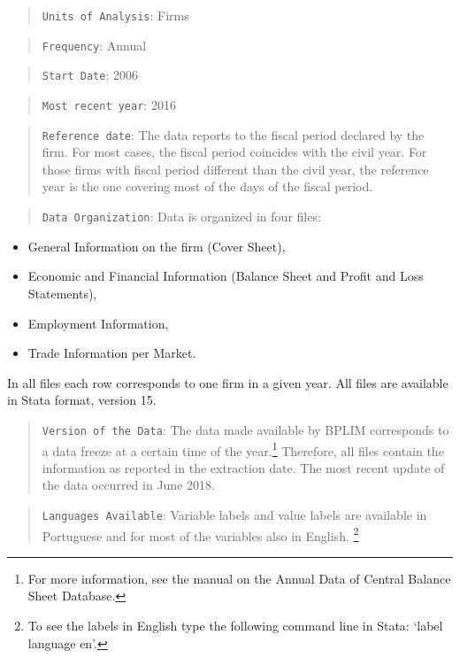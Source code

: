 \documentclass[]{book}
\providecommand{\tightlist}{%
  \setlength{\itemsep}{0pt}\setlength{\parskip}{0pt}}
\let\rmarkdownfootnote\footnote%
\def\footnote{\protect\rmarkdownfootnote}
\begin{document}
\begin{quote}
\texttt{Units\ of\ Analysis}: Firms
\end{quote}

\begin{quote}
\texttt{Frequency}: Annual
\end{quote}

\begin{quote}
\texttt{Start\ Date}: 2006
\end{quote}

\begin{quote}
\texttt{Most\ recent\ year}: 2016
\end{quote}

\begin{quote}
\texttt{Reference\ date}: The data reports to the fiscal period declared by the firm. For most cases, the fiscal period coincides with the civil year. For those firms with fiscal period different than the civil year, the reference year is the one covering most of the days of the fiscal period.
\end{quote}

\begin{quote}
\texttt{Data\ Organization}: Data is organized in four files:
\end{quote}

\begin{itemize}
\tightlist
\item
  General Information on the firm (Cover Sheet),
\item
  Economic and Financial Information (Balance Sheet and Profit and Loss Statements),
\item
  Employment Information,
\item
  Trade Information per Market.
\end{itemize}

In all files each row corresponds to one firm in a given year. All files are available in Stata format, version 15.

\begin{quote}
\texttt{Version\ of\ the\ Data}: The data made available by BPLIM corresponds to a data freeze at a certain time of the year.\footnote{For more information, see the manual on the Annual Data of Central Balance Sheet Database.} Therefore, all files contain the information as reported in the extraction date. The most recent update of the data occurred in June 2018.
\end{quote}

\begin{quote}
\texttt{Languages\ Available}: Variable labels and value labels are available in Portuguese and for most of the variables also in English. \footnote{To see the labels in English type the following command line in Stata: `label language en'.}
\end{quote}
\end{document}
